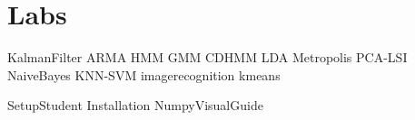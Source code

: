 \documentclass[opener-c,labs,yellow,nociteref]{HJnewsiambook}
\begin{document}
\part{Labs} %
{KalmanFilter}
{ARMA}
{HMM}
{GMM}
{CDHMM}
{LDA}
{Metropolis}
{PCA-LSI}
{NaiveBayes}
{KNN-SVM}
{imagerecognition}
{kmeans}

\begin{appendices}
{SetupStudent}
{Installation}
{NumpyVisualGuide}
\end{appendices}



\end{document}
